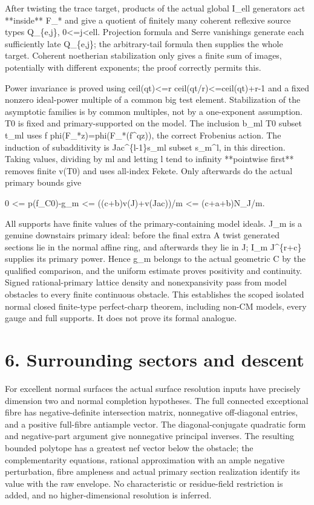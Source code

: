 \documentclass[11pt]{article}
\begin{document}
After twisting the trace target, products of the actual global I\_ell generators act **inside** F\_* and give a quotient of finitely many coherent reflexive source types Q\_\{e,j\}, 0<=j<ell. Projection formula and Serre vanishings generate each sufficiently late Q\_\{e,j\}; the arbitrary-tail formula then supplies the whole target. Coherent noetherian stabilization only gives a finite sum of images, potentially with different exponents; the proof correctly permits this.

Power invariance is proved using ceil(qt)<=r ceil(qt/r)<=ceil(qt)+r-1 and a fixed nonzero ideal-power multiple of a common big test element. Stabilization of the asymptotic families is by common multiples, not by a one-exponent assumption. T0 is fixed and primary-supported on the model. The inclusion b\_ml T0 subset t\_ml uses f phi(F\_*z)=phi(F\_*(f\textasciicircum{}qz)), the correct Frobenius action. The induction of subadditivity is Jac\textasciicircum{}\{l-1\}s\_ml subset s\_m\textasciicircum{}l, in this direction. Taking values, dividing by ml and letting l tend to infinity **pointwise first** removes finite v(T0) and uses all-index Fekete. Only afterwards do the actual primary bounds give

    0 <= p(f\_C0)-g\_m <= ((c+b)v(J)+v(Jac))/m <= (c+a+b)N\_J/m.

All supports have finite values of the primary-containing model ideals. J\_m is a genuine downstairs primary ideal: before the final extra A twist generated sections lie in the normal affine ring, and afterwards they lie in J; I\_m J\textasciicircum{}\{r+c\} supplies its primary power. Hence g\_m belongs to the actual geometric C by the qualified comparison, and the uniform estimate proves positivity and continuity. Signed rational-primary lattice density and nonexpansivity pass from model obstacles to every finite continuous obstacle. This establishes the scoped isolated normal closed finite-type perfect-charp theorem, including non-CM models, every gauge and full supports. It does not prove its formal analogue.

\section{6. Surrounding sectors and descent}

For excellent normal surfaces the actual surface resolution inputs have precisely dimension two and normal completion hypotheses. The full connected exceptional fibre has negative-definite intersection matrix, nonnegative off-diagonal entries, and a positive full-fibre antiample vector. The diagonal-conjugate quadratic form and negative-part argument give nonnegative principal inverses. The resulting bounded polytope has a greatest nef vector below the obstacle; the complementarity equations, rational approximation with an ample negative perturbation, fibre ampleness and actual primary section realization identify its value with the raw envelope. No characteristic or residue-field restriction is added, and no higher-dimensional resolution is inferred.
\end{document}
